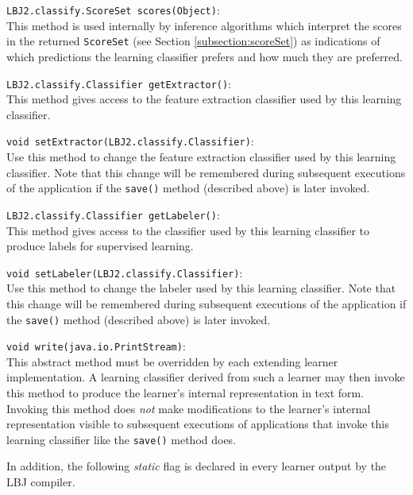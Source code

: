 \begin{list}{}{}
\item[{\tt LBJ2.classify.ScoreSet scores(Object)}:] ~\\
This method is used internally by inference algorithms which interpret the
scores in the returned {\tt ScoreSet} (see Section \ref{subsection:scoreSet})
as indications of which predictions the learning classifier prefers and how
much they are preferred.

\item[{\tt LBJ2.classify.Classifier getExtractor()}:] ~\\
This method gives access to the feature extraction classifier used by this
learning classifier.

\item[{\tt void setExtractor(LBJ2.classify.Classifier)}:] ~\\
Use this method to change the feature extraction classifier used by this
learning classifier.  Note that this change will be remembered during
subsequent executions of the application if the {\tt save()} method (described
above) is later invoked.

\item[{\tt LBJ2.classify.Classifier getLabeler()}:] ~\\
This method gives access to the classifier used by this learning classifier to
produce labels for supervised learning.

\item[{\tt void setLabeler(LBJ2.classify.Classifier)}:] ~\\
Use this method to change the labeler used by this learning classifier.  Note
that this change will be remembered during subsequent executions of the
application if the {\tt save()} method (described above) is later invoked.

\item[{\tt void write(java.io.PrintStream)}:] ~\\
This abstract method must be overridden by each extending learner
implementation.  A learning classifier derived from such a learner may then
invoke this method to produce the learner's internal representation in text
form.  Invoking this method does \emph{not} make modifications to the
learner's internal representation visible to subsequent executions of
applications that invoke this learning classifier like the {\tt save()} method
does.
\end{list}

In addition, the following \emph{static} flag is declared in every learner
output by the LBJ compiler.

